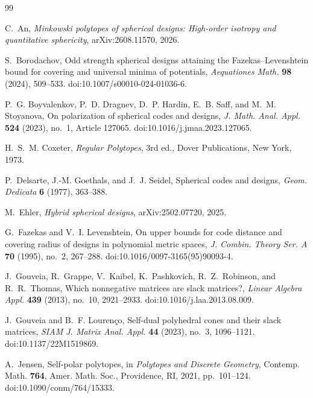 \documentclass[11pt]{amsart}
\theoremstyle{definition}
\theoremstyle{remark}
\begin{document}
\begin{thebibliography}{99}

C.~An,
\newblock \emph{Minkowski polytopes of spherical designs: High-order isotropy and quantitative sphericity},
\newblock arXiv:2608.11570, 2026.

S.~Borodachov,
\newblock Odd strength spherical designs attaining the Fazekas--Levenshtein bound for covering and universal minima of potentials,
\newblock \emph{Aequationes Math.} \textbf{98} (2024), 509--533.
\newblock doi:10.1007/s00010-024-01036-6.

P.~G. Boyvalenkov, P.~D. Dragnev, D.~P. Hardin, E.~B. Saff, and M.~M. Stoyanova,
\newblock On polarization of spherical codes and designs,
\newblock \emph{J. Math. Anal. Appl.} \textbf{524} (2023), no.~1, Article 127065.
\newblock doi:10.1016/j.jmaa.2023.127065.

H.~S.~M. Coxeter,
\newblock \emph{Regular Polytopes}, 3rd ed.,
\newblock Dover Publications, New York, 1973.

P.~Delsarte, J.-M. Goethals, and J.~J. Seidel,
\newblock Spherical codes and designs,
\newblock \emph{Geom. Dedicata} \textbf{6} (1977), 363--388.

M.~Ehler,
\newblock \emph{Hybrid spherical designs},
\newblock arXiv:2502.07720, 2025.

G.~Fazekas and V.~I. Levenshtein,
\newblock On upper bounds for code distance and covering radius of designs in polynomial metric spaces,
\newblock \emph{J. Combin. Theory Ser. A} \textbf{70} (1995), no.~2, 267--288.
\newblock doi:10.1016/0097-3165(95)90093-4.

J.~Gouveia, R.~Grappe, V.~Kaibel, K.~Pashkovich, R.~Z.~Robinson, and R.~R.~Thomas,
\newblock Which nonnegative matrices are slack matrices?,
\newblock \emph{Linear Algebra Appl.} \textbf{439} (2013), no.~10, 2921--2933.
\newblock doi:10.1016/j.laa.2013.08.009.

J.~Gouveia and B.~F. Louren\c{c}o,
\newblock Self-dual polyhedral cones and their slack matrices,
\newblock \emph{SIAM J. Matrix Anal. Appl.} \textbf{44} (2023), no.~3, 1096--1121.
\newblock doi:10.1137/22M1519869.

A.~Jensen,
\newblock Self-polar polytopes,
\newblock in \emph{Polytopes and Discrete Geometry}, Contemp. Math. \textbf{764},
\newblock Amer. Math. Soc., Providence, RI, 2021, pp.~101--124.
\newblock doi:10.1090/conm/764/15333.


\end{thebibliography}
\end{document}
